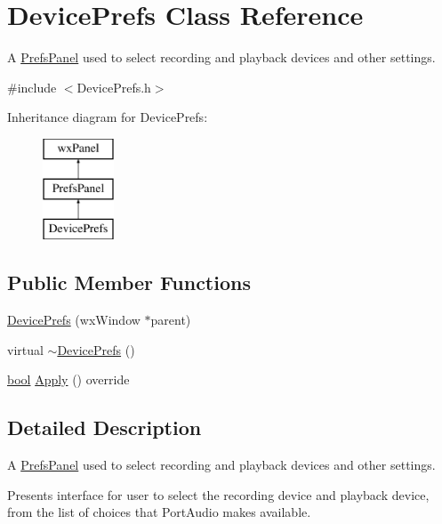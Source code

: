 \hypertarget{class_device_prefs}{}\section{Device\+Prefs Class Reference}
\label{class_device_prefs}


A \hyperlink{class_prefs_panel}{Prefs\+Panel} used to select recording and playback devices and other settings.  




{\ttfamily \#include $<$Device\+Prefs.\+h$>$}

Inheritance diagram for Device\+Prefs\+:\begin{figure}[H]
\begin{center}
\leavevmode
\includegraphics[height=3.000000cm]{class_device_prefs}
\end{center}
\end{figure}
\subsection*{Public Member Functions}
\begin{DoxyCompactItemize}
\item 
\hyperlink{class_device_prefs_aadd146aaabbfa641899c9088639fdca8}{Device\+Prefs} (wx\+Window $\ast$parent)
\item 
virtual \hyperlink{class_device_prefs_a7e5e84fc14e8762bb794e39551a1cf41}{$\sim$\+Device\+Prefs} ()
\item 
\hyperlink{mac_2config_2i386_2lib-src_2libsoxr_2soxr-config_8h_abb452686968e48b67397da5f97445f5b}{bool} \hyperlink{class_device_prefs_a39145224160e02e6e0398d87aa576100}{Apply} () override
\end{DoxyCompactItemize}


\subsection{Detailed Description}
A \hyperlink{class_prefs_panel}{Prefs\+Panel} used to select recording and playback devices and other settings. 

Presents interface for user to select the recording device and playback device, from the list of choices that Port\+Audio makes available.

